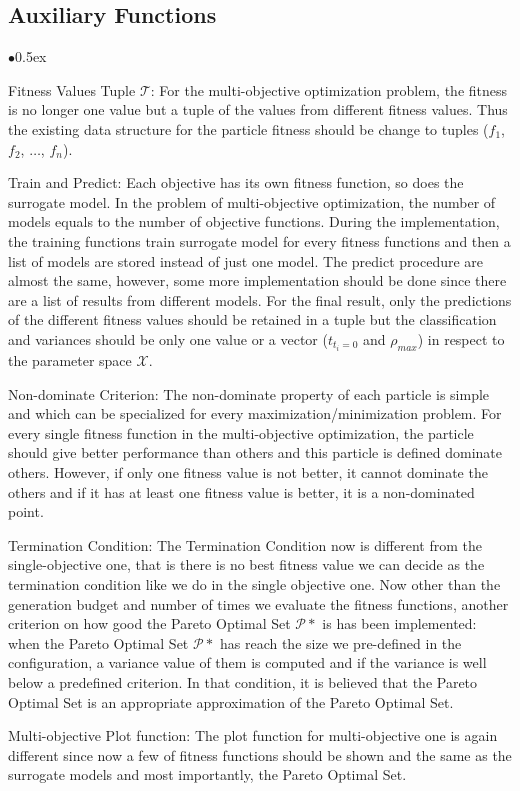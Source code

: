\documentclass[12pt, runningheads,a4paper]{llncs}
\begin{document}
\subsection{Auxiliary Functions}
\begin{list}{$\bullet$}{\itemsep 0.5ex}
\item Fitness Values Tuple $\mathcal{T}$: For the multi-objective optimization problem, the fitness is no longer one value but a tuple of the values from different fitness values. Thus the existing data structure for the particle fitness should be change to tuples ($f_1$, $f_2$, $\dots$, $f_n$).

\item Train and Predict: Each objective has its own fitness function, so does the surrogate model. In the problem of multi-objective optimization, the number of models equals to the number of objective functions. During the implementation, the training functions train surrogate model for every fitness functions and then a list of models are stored instead of just one model. The predict procedure are almost the same, however, some more implementation should be done since there are a list of results from different models. For the final result, only the predictions of the different fitness values should be retained in a tuple but the classification and variances should be only one value or a vector ($t_{t_i = 0}$ and $\rho_{max} $) in respect to the parameter space  $\mathcal{X}$. 

\item Non-dominate Criterion: The non-dominate property of each particle is simple and which can be specialized for every maximization/minimization problem. For every single fitness function in the multi-objective optimization, the particle should give better performance than others and this particle is defined dominate others. However, if only one fitness value is not better, it cannot dominate the others and if it has at least one fitness value is better, it is a non-dominated point.

\item Termination Condition: The Termination Condition now is different from the single-objective one, that is there is no best fitness value we can decide as the termination condition like we do in the single objective one. Now other than the generation budget and number of times we evaluate the fitness functions, another criterion on how good the Pareto Optimal Set  $\mathcal{P}*$ is has been implemented: when the Pareto Optimal Set  $\mathcal{P}*$ has reach the size we pre-defined in the configuration, a variance value of them is computed and if the variance is well below a predefined criterion. In that condition, it is believed that the Pareto Optimal Set is an appropriate approximation of the Pareto Optimal Set.


\item Multi-objective Plot function: The plot function for multi-objective one is again different since now a few of fitness functions should be shown and the same as the surrogate models and most importantly, the Pareto Optimal Set. 

\end{list}
\end{document}
